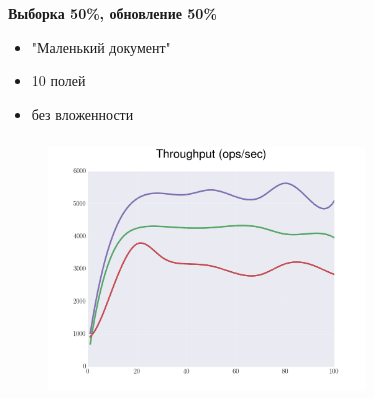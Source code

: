 \documentclass[18pt, compress, aspectratio=169]{beamer}
\begin{document}



\begin{frame}
    \frametitle{}
    \begin{center}
        \textbf{Выборка 50\%, обновление 50\%}
        \begin{itemize}[label={}]
            \item "Маленький документ"
            \item 10 полей
            \item без вложенности
        \end{itemize}
    \end{center}
\end{frame}

\begin{frame}
    \frametitle{}
    \begin{center}
    \begin{figure}
        \includegraphics[width=0.75\textwidth,center]{benchmarks/workload_a_mongo_config/throughput.png}
    \end{figure}
    \end{center}
\end{frame}
\end{document}
